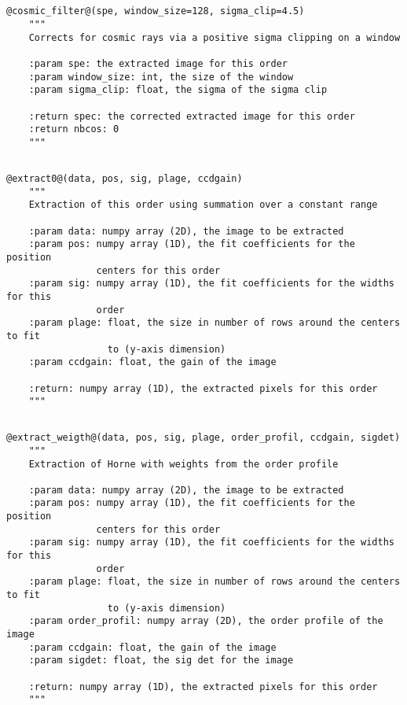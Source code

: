 \subsection{}
\begin{lstlisting}[style=pythonstyle]
@cosmic_filter@(spe, window_size=128, sigma_clip=4.5)
    """
    Corrects for cosmic rays via a positive sigma clipping on a window
    
    :param spe: the extracted image for this order
    :param window_size: int, the size of the window
    :param sigma_clip: float, the sigma of the sigma clip
    
    :return spec: the corrected extracted image for this order
    :return nbcos: 0 
    """

\end{lstlisting}

\subsection{}
\begin{lstlisting}[style=pythonstyle]
@extract0@(data, pos, sig, plage, ccdgain)
    """
    Extraction of this order using summation over a constant range
    
    :param data: numpy array (2D), the image to be extracted
    :param pos: numpy array (1D), the fit coefficients for the position 
                centers for this order
    :param sig: numpy array (1D), the fit coefficients for the widths for this
                order
    :param plage: float, the size in number of rows around the centers to fit
                  to (y-axis dimension)
    :param ccdgain: float, the gain of the image
    
    :return: numpy array (1D), the extracted pixels for this order
    """
\end{lstlisting}

\subsection{}
\begin{lstlisting}[style=pythonstyle]
@extract_weigth@(data, pos, sig, plage, order_profil, ccdgain, sigdet)
    """
    Extraction of Horne with weights from the order profile
    
    :param data: numpy array (2D), the image to be extracted
    :param pos: numpy array (1D), the fit coefficients for the position
                centers for this order
    :param sig: numpy array (1D), the fit coefficients for the widths for this
                order
    :param plage: float, the size in number of rows around the centers to fit
                  to (y-axis dimension)
    :param order_profil: numpy array (2D), the order profile of the image
    :param ccdgain: float, the gain of the image
    :param sigdet: float, the sig det for the image
    
    :return: numpy array (1D), the extracted pixels for this order
    """
\end{lstlisting}

